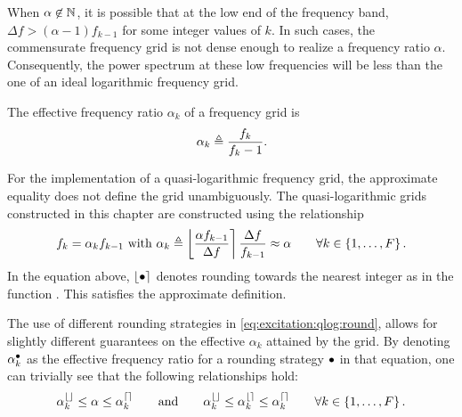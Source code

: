   \begin{remark}
  When $\alpha \not\in \mathbb{N}$, it is possible that at the low end of the frequency band, $\Delta f > \left(\alpha -1 \right) f_{k-1}$ for some integer values of $k$.
  In such cases, the commensurate frequency grid is not dense enough to realize a frequency ratio $\alpha$.
  Consequently, the power spectrum at these low frequencies will be less than the one of an ideal logarithmic frequency grid.
  \end{remark}

  \begin{definition}
  The effective frequency ratio $\alpha_k$ of a frequency grid is
  \begin{equation}
    \alpha_k \triangleq  \frac{f_k}{f_k-1}
    \text{.}
  \end{equation}
  \end{definition}

  \begin{remark}
  For the implementation of a quasi-logarithmic frequency grid,  the approximate equality  \label{eq:qlogGrid} does not define the grid unambiguously.
  The quasi-logarithmic grids constructed in this chapter are constructed using the relationship
  \begin{equation}
    f_k = \alpha_k f_{k-1} 
    \text{ with } 
      \alpha_k \triangleq 
          \left\lfloor    \frac{\alpha f_{k-1}}{\Delta f} \right\rceil    
           \frac{\Delta f}{f_{k-1}}
      \approx \alpha 
      \qquad 
          \forall k \in \left\{1,\ldots,F\right\}
     \text{.}
     \label{eq:excitation:qlog:round}
  \end{equation}
  In the equation above, $\left\lfloor \bullet \right\rceil$ denotes rounding towards the nearest integer as in the \MATLAB function .
  This satisfies the approximate definition.
  \end{remark}

  \begin{remark}
  The use of different rounding strategies in \eqref{eq:excitation:qlog:round}, allows for slightly different guarantees on the effective $\alpha_k$ attained by the grid.
  By denoting $\alpha_k^{\bullet}$ as the effective frequency ratio for a rounding strategy $\bullet$  in that equation, one can trivially see that the following relationships hold:
  \begin{equation}
  \alpha_k^{\left\lfloor  \right\rfloor} \leq \alpha \leq  \alpha_k^{\left\lceil  \right\rceil}
  \qquad \text{and} \qquad
  \alpha_k^{\left\lfloor  \right\rfloor} \leq \alpha_k^{\left\lfloor  \right\rceil} \leq  \alpha_k^{\left\lceil  \right\rceil}
  \qquad
  \forall k \in \left\{1,\ldots,F\right\}
  \text{.}
  \end{equation}
  \end{remark}

